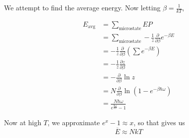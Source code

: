 \documentclass[12pt]{article}
\begin{document}
We attempt to find the average energy. Now letting $\beta = \frac{1}{kT}$,

\begin{align*}
E_{\text{avg}} &= \sum_{\text{microstate}} EP \\
               &= \sum_{\text{microstate}} -\frac{1}{z} \frac{\partial}{\partial\beta} e^{-\beta E} \\
               &= -\frac{1}{z} \frac{\partial}{\partial\beta}\left(\sum e^{-\beta E}\right) \\
               &= -\frac{1}{z} \frac{\partial z}{\partial\beta} \\
               &= -\frac{\partial}{\partial\beta}\ln z \\
               &= N\frac{\partial}{\partial\beta}\ln\left(1-e^{-\beta\hbar\omega}\right) \\
               &= \frac{N\hbar\omega}{e^{\frac{\hbar\omega}{kT}}-1}
\end{align*}

Now at high $T$, we approximate $e^x-1 \approx x$, so that gives us
$$\overline E \approx NkT$$
\end{document}
